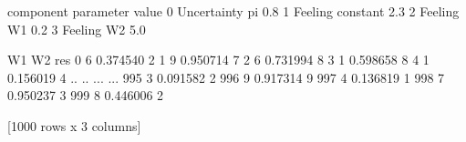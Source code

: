 \documentclass[letterpaper,10pt,english]{sphinxmanual}
\begin{document}
\noindent{}
\def\sphinxLiteralBlockLabel{\label{\detokenize{manual:id46}}}
\begin{sphinxVerbatim}[commandchars=\\\{\},numbers=left,firstnumber=1,stepnumber=1]
\end{sphinxVerbatim}

\begin{sphinxVerbatim}[commandchars=\\\{\}]
     component parameter  value
0  Uncertainty        pi    0.8
1      Feeling  constant    2.3
2      Feeling        W1    0.2
3      Feeling        W2   \PYGZhy{}5.0
\end{sphinxVerbatim}
\def\sphinxLiteralBlockLabel{\label{\detokenize{manual:id47}}}
\begin{sphinxVerbatim}[commandchars=\\\{\},numbers=left,firstnumber=1,stepnumber=1]
\end{sphinxVerbatim}

\begin{sphinxVerbatim}[commandchars=\\\{\}]
     W1        W2  res
0     6  0.374540    2
1     9  0.950714    7
2     6  0.731994    8
3     1  0.598658    8
4     1  0.156019    4
..   ..       ...  ...
995   3  0.091582    2
996   9  0.917314    9
997   4  0.136819    1
998   7  0.950237    3
999   8  0.446006    2

[1000 rows x 3 columns]
\end{sphinxVerbatim}
\end{document}

